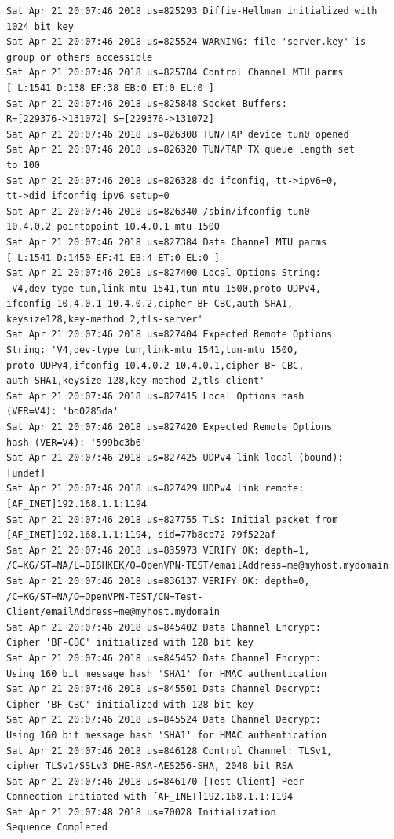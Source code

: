 \documentclass[11pt]{article}
\begin{document}
\begin{lstlisting}
Sat Apr 21 20:07:46 2018 us=825293 Diffie-Hellman initialized with
1024 bit key
Sat Apr 21 20:07:46 2018 us=825524 WARNING: file 'server.key' is
group or others accessible
Sat Apr 21 20:07:46 2018 us=825784 Control Channel MTU parms
[ L:1541 D:138 EF:38 EB:0 ET:0 EL:0 ]
Sat Apr 21 20:07:46 2018 us=825848 Socket Buffers:
R=[229376->131072] S=[229376->131072]
Sat Apr 21 20:07:46 2018 us=826308 TUN/TAP device tun0 opened
Sat Apr 21 20:07:46 2018 us=826320 TUN/TAP TX queue length set
to 100
Sat Apr 21 20:07:46 2018 us=826328 do_ifconfig, tt->ipv6=0,
tt->did_ifconfig_ipv6_setup=0
Sat Apr 21 20:07:46 2018 us=826340 /sbin/ifconfig tun0
10.4.0.2 pointopoint 10.4.0.1 mtu 1500
Sat Apr 21 20:07:46 2018 us=827384 Data Channel MTU parms
[ L:1541 D:1450 EF:41 EB:4 ET:0 EL:0 ]
Sat Apr 21 20:07:46 2018 us=827400 Local Options String:
'V4,dev-type tun,link-mtu 1541,tun-mtu 1500,proto UDPv4,
ifconfig 10.4.0.1 10.4.0.2,cipher BF-CBC,auth SHA1,
keysize128,key-method 2,tls-server'
Sat Apr 21 20:07:46 2018 us=827404 Expected Remote Options
String: 'V4,dev-type tun,link-mtu 1541,tun-mtu 1500,
proto UDPv4,ifconfig 10.4.0.2 10.4.0.1,cipher BF-CBC,
auth SHA1,keysize 128,key-method 2,tls-client'
Sat Apr 21 20:07:46 2018 us=827415 Local Options hash
(VER=V4): 'bd0285da'
Sat Apr 21 20:07:46 2018 us=827420 Expected Remote Options
hash (VER=V4): '599bc3b6'
Sat Apr 21 20:07:46 2018 us=827425 UDPv4 link local (bound):
[undef]
Sat Apr 21 20:07:46 2018 us=827429 UDPv4 link remote:
[AF_INET]192.168.1.1:1194
Sat Apr 21 20:07:46 2018 us=827755 TLS: Initial packet from
[AF_INET]192.168.1.1:1194, sid=77b8cb72 79f522af
Sat Apr 21 20:07:46 2018 us=835973 VERIFY OK: depth=1,
/C=KG/ST=NA/L=BISHKEK/O=OpenVPN-TEST/emailAddress=me@myhost.mydomain
Sat Apr 21 20:07:46 2018 us=836137 VERIFY OK: depth=0,
/C=KG/ST=NA/O=OpenVPN-TEST/CN=Test-Client/emailAddress=me@myhost.mydomain
Sat Apr 21 20:07:46 2018 us=845402 Data Channel Encrypt:
Cipher 'BF-CBC' initialized with 128 bit key
Sat Apr 21 20:07:46 2018 us=845452 Data Channel Encrypt:
Using 160 bit message hash 'SHA1' for HMAC authentication
Sat Apr 21 20:07:46 2018 us=845501 Data Channel Decrypt:
Cipher 'BF-CBC' initialized with 128 bit key
Sat Apr 21 20:07:46 2018 us=845524 Data Channel Decrypt:
Using 160 bit message hash 'SHA1' for HMAC authentication
Sat Apr 21 20:07:46 2018 us=846128 Control Channel: TLSv1,
cipher TLSv1/SSLv3 DHE-RSA-AES256-SHA, 2048 bit RSA
Sat Apr 21 20:07:46 2018 us=846170 [Test-Client] Peer
Connection Initiated with [AF_INET]192.168.1.1:1194
Sat Apr 21 20:07:48 2018 us=70028 Initialization
Sequence Completed
\end{lstlisting}
\end{document}
